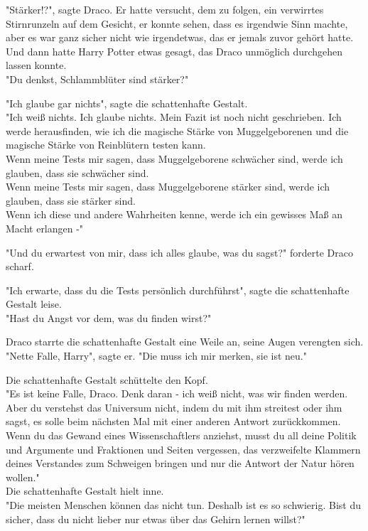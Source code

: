 {"Stärker!?", sagte Draco. Er hatte versucht, dem zu folgen, ein verwirrtes Stirnrunzeln auf dem Gesicht, er konnte sehen, dass es irgendwie Sinn machte, aber es war ganz sicher nicht wie irgendetwas, das er jemals zuvor gehört hatte.\\ Und dann hatte Harry Potter etwas gesagt, das Draco unmöglich durchgehen lassen konnte.\\ "Du denkst, Schlammblüter sind stärker?"

"Ich glaube gar nichts", sagte die schattenhafte Gestalt.\\ "Ich weiß nichts. Ich glaube nichts. Mein Fazit ist noch nicht geschrieben. Ich werde herausfinden, wie ich die magische Stärke von Muggelgeborenen und die magische Stärke von Reinblütern testen kann.\\ Wenn meine Tests mir sagen, dass Muggelgeborene schwächer sind, werde ich glauben, dass sie schwächer sind.\\ Wenn meine Tests mir sagen, dass Muggelgeborene stärker sind, werde ich glauben, dass sie stärker sind.\\ Wenn ich diese und andere Wahrheiten kenne, werde ich ein gewisses Maß an Macht erlangen -"

"Und du erwartest von mir, dass ich alles glaube, was du sagst?" forderte Draco scharf.

"Ich erwarte, dass du die Tests persönlich durchführst", sagte die schattenhafte Gestalt leise.\\ "Hast du Angst vor dem, was du finden wirst?"

Draco starrte die schattenhafte Gestalt eine Weile an, seine Augen verengten sich.\\ "Nette Falle, Harry", sagte er. "Die muss ich mir merken, sie ist neu."

Die schattenhafte Gestalt schüttelte den Kopf.\\ "Es ist keine Falle, Draco. Denk daran - ich weiß nicht, was wir finden werden. Aber du verstehst das Universum nicht, indem du mit ihm streitest oder ihm sagst, es solle beim nächsten Mal mit einer anderen Antwort zurückkommen.\\ Wenn du das Gewand eines Wissenschaftlers anziehst, musst du all deine Politik und Argumente und Fraktionen und Seiten vergessen, das verzweifelte Klammern deines Verstandes zum Schweigen bringen und nur die Antwort der Natur hören wollen."\\ Die schattenhafte Gestalt hielt inne.\\ "Die meisten Menschen können das nicht tun. Deshalb ist es so schwierig. Bist du sicher, dass du nicht lieber nur etwas über das Gehirn lernen willst?"

}
